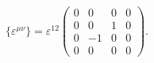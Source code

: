 \begin{equation}
\{\varepsilon^{\mu\nu}\} = \varepsilon^{12}
  \left( \begin{array}{cccc}
0 & 0 & 0 & 0 \\
0 & 0 & 1 & 0 \\
0 & -1 & 0 & 0 \\
0 & 0 & 0 & 0
 \end{array} \right).
\label{19}
\end{equation}

